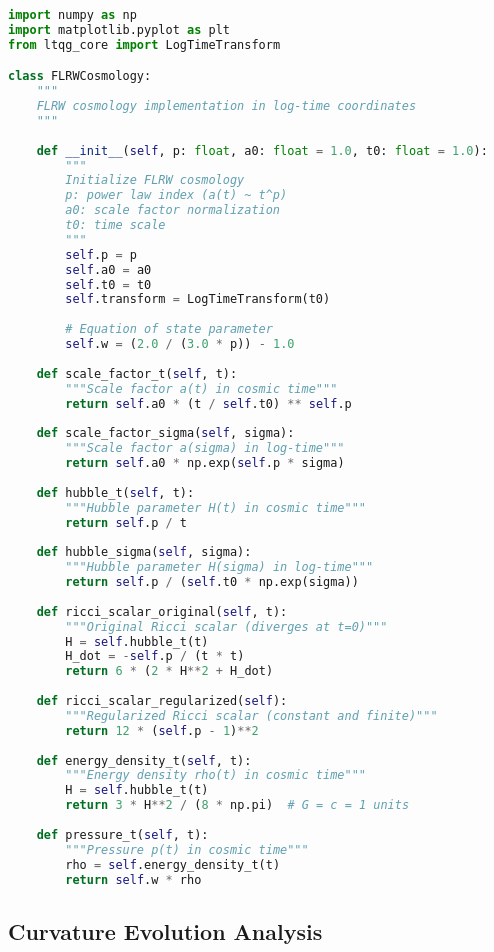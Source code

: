 \documentclass[11pt,a4paper]{article}
\begin{document}
\begin{lstlisting}[language=Python, caption=FLRW Cosmology in Log-Time]
import numpy as np
import matplotlib.pyplot as plt
from ltqg_core import LogTimeTransform

class FLRWCosmology:
    """
    FLRW cosmology implementation in log-time coordinates
    """
    
    def __init__(self, p: float, a0: float = 1.0, t0: float = 1.0):
        """
        Initialize FLRW cosmology
        p: power law index (a(t) ~ t^p)
        a0: scale factor normalization
        t0: time scale
        """
        self.p = p
        self.a0 = a0
        self.t0 = t0
        self.transform = LogTimeTransform(t0)
        
        # Equation of state parameter
        self.w = (2.0 / (3.0 * p)) - 1.0
        
    def scale_factor_t(self, t):
        """Scale factor a(t) in cosmic time"""
        return self.a0 * (t / self.t0) ** self.p
    
    def scale_factor_sigma(self, sigma):
        """Scale factor a(sigma) in log-time"""
        return self.a0 * np.exp(self.p * sigma)
    
    def hubble_t(self, t):
        """Hubble parameter H(t) in cosmic time"""
        return self.p / t
    
    def hubble_sigma(self, sigma):
        """Hubble parameter H(sigma) in log-time"""
        return self.p / (self.t0 * np.exp(sigma))
    
    def ricci_scalar_original(self, t):
        """Original Ricci scalar (diverges at t=0)"""
        H = self.hubble_t(t)
        H_dot = -self.p / (t * t)
        return 6 * (2 * H**2 + H_dot)
    
    def ricci_scalar_regularized(self):
        """Regularized Ricci scalar (constant and finite)"""
        return 12 * (self.p - 1)**2
    
    def energy_density_t(self, t):
        """Energy density rho(t) in cosmic time"""
        H = self.hubble_t(t)
        return 3 * H**2 / (8 * np.pi)  # G = c = 1 units
    
    def pressure_t(self, t):
        """Pressure p(t) in cosmic time"""
        rho = self.energy_density_t(t)
        return self.w * rho
\end{lstlisting}

\subsection{Curvature Evolution Analysis}
\end{document}

